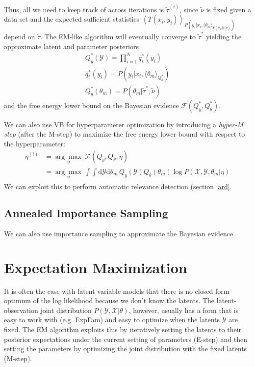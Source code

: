 \documentclass[a4paper]{article}
\begin{document}
Thus, all we need to keep track of across iterations is $\tilde{\tau}^{(i)}$, since $\tilde{\nu}$ is fixed given a data set and the expected sufficient statistics $\left\langle T(x_i,y_i)\right\rangle_{P(y_i|x_i,\langle\theta_m\rangle_{P(\theta_m|\tilde{\tau},\tilde{\nu})})}$ depend on $\tilde{\tau}$. The EM-like algorithm will eventually converge to $\tilde{\tau}^*$ yielding the approximate latent and parameter posteriors
\begin{gather*}
Q^*_y(\mathcal{Y}) = \prod_{i=1}^N q^*_i(y_i) \\
q^*_i(y_i) = P(y_i|x_i,\langle\theta_m\rangle_{Q^*_\theta}) \\
Q^*_\theta(\theta_m) = P(\theta_m|\tilde{\tau}^*,\tilde{\nu})
\end{gather*}
and the free energy lower bound on the Bayesian evidence $\mathcal{F}(Q^*_y,Q^*_\theta)$.

We can also use VB for hyperparameter optimization by introducing a \emph{hyper-M step} (after the M-step) to maximize the free energy lower bound with respect to the hyperparameter:
\begin{align*}
\eta^{(i)} &= \underset{\eta}{\arg\max}\, \mathcal{F}(Q_y,Q_\theta,\eta) \\
&= \underset{\eta}{\arg\max}\, \int\int \textrm{d}\mathcal{Y} \textrm{d}\theta_m \, Q_y(\mathcal{Y})Q_\theta(\theta_m) \log P(\mathcal{X},\mathcal{Y},\theta_m|\eta)
\end{align*}
We can exploit this to perform automatic relevance detection (section \ref{ard}.

\subsection{Annealed Importance Sampling}
We can also use importance sampling to approximate the Bayesian evidence.

\section{Expectation Maximization} \label{expectation maximization}
It is often the case with latent variable models that there is no closed form optimum of the log likelihood because we don't know the latents. The latent-observation joint distribution $P(\mathcal{Y,X}|\theta)$, however, usually has a form that is easy to work with (e.g. ExpFam) and easy to optimize when the latents $\mathcal{Y}$ are fixed. The EM algorithm exploits this by iteratively setting the latents to their posterior expectations under the current setting of parameters (E-step) and then setting the parameters by optimizing the joint distribution with the fixed latents (M-step).
\end{document}
